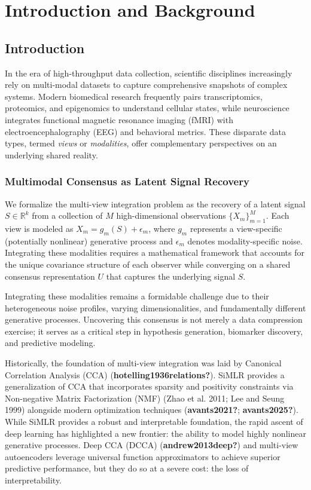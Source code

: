 \documentclass[
  letterpaper,
]{report}
\begin{document}

\chapter{Introduction and Background}\label{introduction-and-background}

\section{Introduction}\label{introduction}

In the era of high-throughput data collection, scientific disciplines
increasingly rely on multi-modal datasets to capture comprehensive
snapshots of complex systems. Modern biomedical research frequently
pairs transcriptomics, proteomics, and epigenomics to understand
cellular states, while neuroscience integrates functional magnetic
resonance imaging (fMRI) with electroencephalography (EEG) and
behavioral metrics. These disparate data types, termed \emph{views} or
\emph{modalities}, offer complementary perspectives on an underlying
shared reality.

\subsection{Multimodal Consensus as Latent Signal
Recovery}\label{multimodal-consensus-as-latent-signal-recovery}

We formalize the multi-view integration problem as the recovery of a
latent signal \(S \in \mathbb{R}^k\) from a collection of \(M\)
high-dimensional observations \(\{X_m\}_{m=1}^M\). Each view is modeled
as \(X_m = g_m(S) + \epsilon_m\), where \(g_m\) represents a
view-specific (potentially nonlinear) generative process and
\(\epsilon_m\) denotes modality-specific noise. Integrating these
modalities requires a mathematical framework that accounts for the
unique covariance structure of each observer while converging on a
shared consensus representation \(U\) that captures the underlying
signal \(S\).

Integrating these modalities remains a formidable challenge due to their
heterogeneous noise profiles, varying dimensionalities, and
fundamentally different generative processes. Uncovering this consensus
is not merely a data compression exercise; it serves as a critical step
in hypothesis generation, biomarker discovery, and predictive modeling.

Historically, the foundation of multi-view integration was laid by
Canonical Correlation Analysis (CCA) (\textbf{hotelling1936relations?}).
SiMLR provides a generalization of CCA that incorporates sparsity and
positivity constraints via Non-negative Matrix Factorization (NMF) (Zhao
et al. 2011; Lee and Seung 1999) alongside modern optimization
techniques (\textbf{avants2021?}; \textbf{avants2025?}). While SiMLR
provides a robust and interpretable foundation, the rapid ascent of deep
learning has highlighted a new frontier: the ability to model highly
nonlinear generative processes. Deep CCA (DCCA)
(\textbf{andrew2013deep?}) and multi-view autoencoders leverage
universal function approximators to achieve superior predictive
performance, but they do so at a severe cost: the loss of
interpretability.
\end{document}
